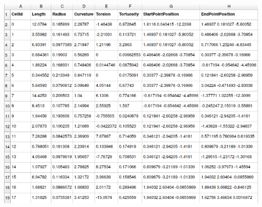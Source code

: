 \documentclass[compress]{beamer}
\begin{document}
\begin{frame}[label=1dge]
\begin{minipage}{\linewidth}
{\begin{minipage}{0.1\linewidth}
		\end{minipage}
			\begin{minipage}{0.25\linewidth}
				\includegraphics[width=\linewidth]{images/0053_extract4.png}
		\end{minipage}}
			\begin{minipage}{0.195\linewidth}
		\end{minipage}
		\end{minipage}
\end{frame}


\end{document}
